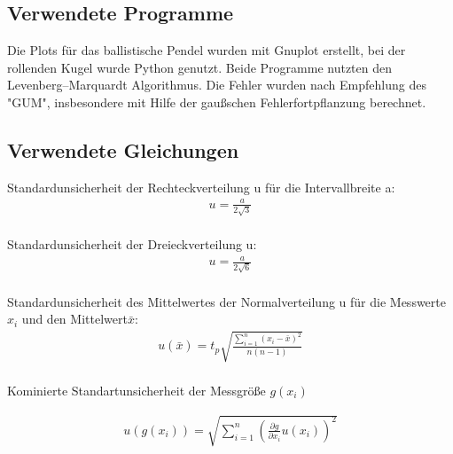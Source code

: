 \subsection{Verwendete Programme}
Die Plots für das ballistische Pendel wurden mit Gnuplot erstellt, bei der rollenden Kugel wurde Python genutzt. Beide Programme nutzten den  Levenberg–Marquardt Algorithmus. Die Fehler wurden nach Empfehlung des "GUM", insbesondere mit Hilfe der gaußschen Fehlerfortpflanzung berechnet.

\subsection{Verwendete Gleichungen}\label{VGuD}









Standardunsicherheit der Rechteckverteilung u für die Intervallbreite a:
\begin{align}
	u=\frac{a}{2\sqrt{3}}\label{eq:sur}
\end{align} \\

Standardunsicherheit der Dreieckverteilung u: \begin{align}
	u=\frac{a}{2\sqrt{6}}\label{eq:sud}
\end{align}\\

Standardunsicherheit des Mittelwertes der Normalverteilung u für die Messwerte $x_i$ und den Mittelwert$\bar{x}$:
\begin{align}
	u(\bar{x})=  t_p  \sqrt{  \frac{\sum_{i=1}^{n}  (x_i-\bar{x})^2} {n (n-1)} }
	\label{eq:sunv}       
\end{align} \\

Kominierte Standartunsicherheit der Messgröße $g(x_i)$

\begin{align}
	u(g(x_i))=   \sqrt{  \sum_{i=1}^{n} \left( \frac{\partial g}{\partial x_i} u(x_i) \right)^2  }
	\label{eq:kombsu}       
\end{align}\\

